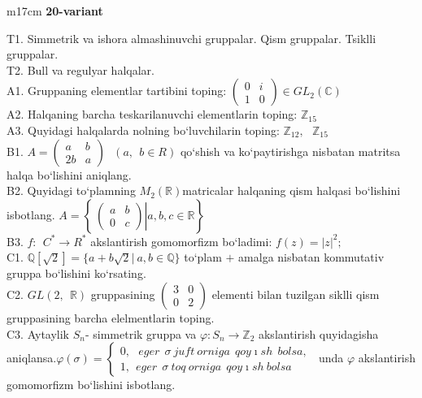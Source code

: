 \documentclass{article}
\begin{document}
\begin{tabular}{m{17cm}}
\textbf{20-variant}
\newline

T1. Simmetrik va ishora almashinuvchi gruppalar. Qism gruppalar. Tsiklli gruppalar. \\
T2. Bull va regulyar halqalar. \\
A1. Gruppaning elementlar tartibini toping: \(\begin{pmatrix}
0 & i \\
1 & 0
\end{pmatrix} \in GL_{2}(\mathbb{C})\) \\
A2. Halqaning barcha teskarilanuvchi elementlarin toping: \(\mathbb{Z}_{15}\) \\
A3. Quyidagi halqalarda nolning bo`luvchilarin toping: \(\mathbb{Z}_{12},\ \ \ \mathbb{Z}_{15}\) \\
B1. \(A = \begin{pmatrix}
a & b \\
2b & a
\end{pmatrix}\ \ \ (a,\ \ b \in R)\) qo`shish va ko`paytirishga nisbatan matritsa halqa bo`lishini aniqlang. \\
B2. Quyidagi to`plamning \(M_{2}(\mathbb{R})\)matricalar halqaning qism halqasi bo`lishini isbotlang. \(A = \left\{ \left. \ \begin{pmatrix}
a & b \\
0 & c
\end{pmatrix} \right|a,b,c\mathbb{\in R} \right\}\) \\
B3. \(f:\ \ C^{*} \rightarrow R^{*}\) akslantirish gomomorfizm bo`ladimi: \(f(z) = |z|^{2};\) \\
C1. \(\mathbb{Q}\left\lbrack \sqrt{2} \right\rbrack = \{ a + b\sqrt{2}|\ a,b\mathbb{\in Q}\}\) to`plam \(+\) amalga nisbatan kommutativ gruppa bo`lishini ko`rsating. \\
C2. \(GL(2,\mathbb{\ \ R})\) gruppasining \(\begin{pmatrix}
3 & 0 \\
0 & 2
\end{pmatrix}\) elementi bilan tuzilgan siklli qism gruppasining barcha elelmentlarin toping. \\
C3. Aytaylik \(S_{n}\)- simmetrik gruppa va \(\varphi:S_{n} \rightarrow \mathbb{Z}_{2}\) akslantirish quyidagisha aniqlansa.\(\varphi(\sigma) = \left\{ \begin{matrix}
0,\ \ \ eger\ \ \sigma\ juft\ orniga\ \ qoy\imath sh\ \ bolsa, \\
1,\ \ eger\ \ \sigma\ toq\ orniga\ \ qoy\imath sh\ bolsa
\end{matrix} \right.\ \) unda \(\varphi\) akslantirish gomomorfizm bo`lishini isbotlang. \\

\end{tabular}
\vspace{1cm}
\end{document}
